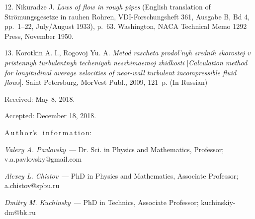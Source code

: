 {12. Nikuradze J. \emph{Laws of flow in rough pipes} (English
translation of Str\"{o}mungsgesetze in rauhen Rohren,
VDI-Forschungsheft 361, Ausgabe B, Bd 4, pp.~1--22, July/August
1933), p.~63. Washington, NACA Technical Memo 1292 Press, November
1950.

13. Korotkin A. I., Rogovoj Yu. A. \emph{Metod rascheta prodol'nyh
srednih skorostej v pristennyh turbulentnyh techeniyah
neszhimaemoj zhidkosti}     [\emph{Calculation method for
longitudinal average velocities of near-wall turbulent
incompressible fluid flows}].  Saint Petersburg, MorVest Publ.,
2009, 121~p. (In Russian)


\vskip1.5mm Received:  May 8, 2018.

Accepted: December 18, 2018.


\vskip6mm A\,u\,t\,h\,o\,r's \ i\,n\,f\,o\,r\,m\,a\,t\,i\,o\,n:%

\vskip2mm \textit{Valery A. Pavlovsky}~--- Dr. Sci. in Physics and
Mathematics, Professor; v.a.pavlovsky@gmail.com

\vskip2mm \textit{Alexey L. Chistov}~--- PhD in Physics and
Mathematics, Associate Professor; a.chistov@spbu.ru

\vskip2mm \textit{Dmitry M. Kuchinsky}~--- PhD in Technics,
Associate Professor; kuchinskiy-dm@bk.ru

}
